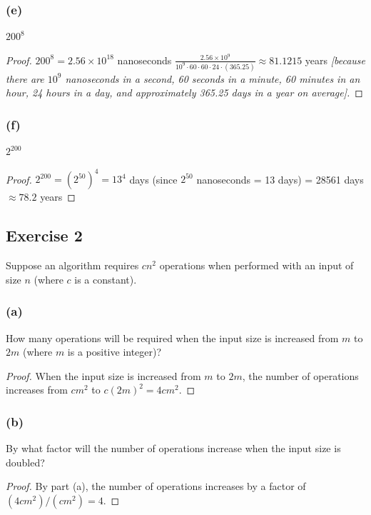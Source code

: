 \documentclass[14pt]{extarticle}
\begin{document}
\subsubsection{(e)}
\(200^8\)
\begin{proof}
\(200^8 = 2.56 \times 10^{18}\) nanoseconds \(\frac{2.56 \times 10^9}{10^9 \cdot 60 \cdot 60 \cdot 24 \cdot (365.25)} 
\approx 81.1215\) years {\it [because there are \(10^9\) nanoseconds in a second, 60 seconds in a minute, 60 minutes in 
an hour, 24 hours in a day, and approximately 365.25 days in a year on average].}
\end{proof}

\subsubsection{(f)}
\(2^{200}\)
\begin{proof}
\(2^{200} = (2^{50})^4 = 13^4\) days (since \(2^{50}\) nanoseconds = 13 days) = 28561 days \(\approx 78.2\) years
\end{proof}

\subsection{Exercise 2}
Suppose an algorithm requires \(cn^2\) operations when performed with an input of size \(n\) (where \(c\) is a 
constant).

\subsubsection{(a)}
How many operations will be required when the input size is increased from \(m\) to \(2m\) (where \(m\) is a positive 
integer)?

\begin{proof}
When the input size is increased from \(m\) to \(2m\), the number of operations increases from \(cm^2\) to 
\(c(2m)^2 = 4cm^2\).
\end{proof}

\subsubsection{(b)}
By what factor will the number of operations increase when the input size is doubled?

\begin{proof}
By part (a), the number of operations increases by a factor of \((4cm^2)/(cm^2) = 4\).
\end{proof}
\end{document}
